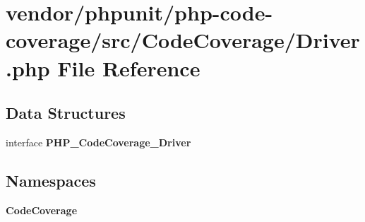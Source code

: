 \section{vendor/phpunit/php-\/code-\/coverage/src/\+Code\+Coverage/\+Driver.php File Reference}
\label{_driver_8php}
\subsection*{Data Structures}
\begin{DoxyCompactItemize}
\item 
interface {\bf P\+H\+P\+\_\+\+Code\+Coverage\+\_\+\+Driver}
\end{DoxyCompactItemize}
\subsection*{Namespaces}
\begin{DoxyCompactItemize}
\item 
 {\bf Code\+Coverage}
\end{DoxyCompactItemize}

